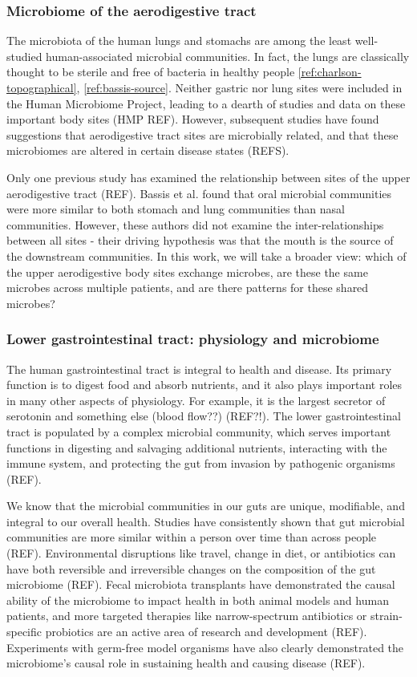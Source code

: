 \documentclass[12pt]{article}
\begin{document}
\subsubsection{Microbiome of the aerodigestive tract}
The microbiota of the human lungs and stomachs are among the least well-studied human-associated microbial communities. In fact, the lungs are classically thought to be sterile and free of bacteria in healthy people \ref{ref:charlson-topographical}, \ref{ref:bassis-source}. Neither gastric nor lung sites were included in the Human Microbiome Project, leading to a dearth of studies and data on these important body sites (HMP REF). However, subsequent studies have found suggestions that aerodigestive tract sites are microbially related, and that these microbiomes are altered in certain disease states (REFS).

Only one previous study has examined the relationship between sites of the upper aerodigestive tract (REF). Bassis et al. found that oral microbial communities were more similar to both stomach and lung communities than nasal communities. However, these authors did not examine the inter-relationships between all sites - their driving hypothesis was that the mouth is the source of the downstream communities. In this work, we will take a broader view: which of the upper aerodigestive body sites exchange microbes, are these the same microbes across multiple patients, and are there  patterns for these shared microbes? 

\subsubsection{Lower gastrointestinal tract: physiology and microbiome}
The human gastrointestinal tract is integral to health and disease. Its primary function is to digest food and absorb nutrients, and it also plays important roles in many other aspects of physiology. For example, it is the largest secretor of serotonin and something else (blood flow??) (REF?!). The lower gastrointestinal tract is populated by a complex microbial community, which serves important functions in digesting and salvaging additional nutrients, interacting with the immune system, and protecting the gut from invasion by pathogenic organisms (REF). 

We know that the microbial communities in our guts are unique, modifiable, and integral to our overall health. Studies have consistently shown that gut microbial communities are more similar within a person over time than across people (REF). Environmental disruptions like travel, change in diet, or antibiotics can have both reversible and irreversible changes on the composition of the gut microbiome (REF). Fecal microbiota transplants have demonstrated the causal ability of the microbiome to impact health in both animal models and human patients, and more targeted therapies like narrow-spectrum antibiotics or strain-specific probiotics are an active area of research and development (REF). Experiments with germ-free model organisms have also clearly demonstrated the microbiome's causal role in sustaining health and causing disease (REF).
\end{document}
